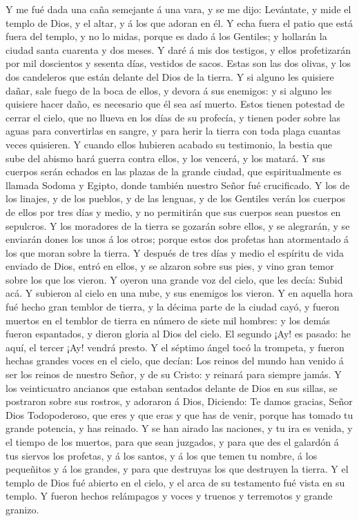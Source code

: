  Y me fué dada una caña semejante á una vara, y se me
dijo: Levántate, y mide el templo de Dios, y el altar, y á los que
adoran en él.  Y echa fuera el patio que está fuera del
templo, y no lo midas, porque es dado á los Gentiles; y hollarán la
ciudad santa cuarenta y dos meses.  Y daré á mis dos
testigos, y ellos profetizarán por mil doscientos y sesenta días,
vestidos de sacos.  Estas son las dos olivas, y los dos
candeleros que están delante del Dios de la tierra.  Y si
alguno les quisiere dañar, sale fuego de la boca de ellos, y devora á
sus enemigos: y si alguno les quisiere hacer daño, es necesario que él
sea así muerto.  Estos tienen potestad de cerrar el cielo,
que no llueva en los días de su profecía, y tienen poder sobre las aguas
para convertirlas en sangre, y para herir la tierra con toda plaga
cuantas veces quisieren.  Y cuando ellos hubieren acabado
su testimonio, la bestia que sube del abismo hará guerra contra ellos, y
los vencerá, y los matará.  Y sus cuerpos serán echados en
las plazas de la grande ciudad, que espiritualmente es llamada Sodoma y
Egipto, donde también nuestro Señor fué crucificado.  Y
los de los linajes, y de los pueblos, y de las lenguas, y de los
Gentiles verán los cuerpos de ellos por tres días y medio, y no
permitirán que sus cuerpos sean puestos en sepulcros.  Y
los moradores de la tierra se gozarán sobre ellos, y se alegrarán, y se
enviarán dones los unos á los otros; porque estos dos profetas han
atormentado á los que moran sobre la tierra.  Y después
de tres días y medio el espíritu de vida enviado de Dios, entró en
ellos, y se alzaron sobre sus pies, y vino gran temor sobre los que los
vieron.  Y oyeron una grande voz del cielo, que les
decía: Subid acá. Y subieron al cielo en una nube, y sus enemigos los
vieron.  Y en aquella hora fué hecho gran temblor de
tierra, y la décima parte de la ciudad cayó, y fueron muertos en el
temblor de tierra en número de siete mil hombres: y los demás fueron
espantados, y dieron gloria al Dios del cielo.  El
segundo ¡Ay! es pasado: he aquí, el tercer ¡Ay! vendrá presto.
 Y el séptimo ángel tocó la trompeta, y fueron hechas
grandes voces en el cielo, que decían: Los reinos del mundo han venido á
ser los reinos de nuestro Señor, y de su Cristo: y reinará para siempre
jamás.  Y los veinticuatro ancianos que estaban sentados
delante de Dios en sus sillas, se postraron sobre sus rostros, y
adoraron á Dios,  Diciendo: Te damos gracias, Señor Dios
Todopoderoso, que eres y que eras y que has de venir, porque has tomado
tu grande potencia, y has reinado.  Y se han airado las
naciones, y tu ira es venida, y el tiempo de los muertos, para que sean
juzgados, y para que des el galardón á tus siervos los profetas, y á los
santos, y á los que temen tu nombre, á los pequeñitos y á los grandes, y
para que destruyas los que destruyen la tierra.  Y el
templo de Dios fué abierto en el cielo, y el arca de su testamento fué
vista en su templo. Y fueron hechos relámpagos y voces y truenos y
terremotos y grande granizo.

